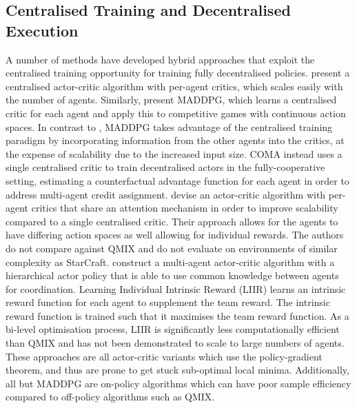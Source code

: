 \documentclass[twoside,11pt]{article}
\begin{document}
\subsection{Centralised Training and Decentralised Execution}
A number of methods have developed hybrid approaches that exploit the centralised training opportunity for training fully decentralised policies. 
\citet{gupta_cooperative_2017} present a centralised actor-critic algorithm with per-agent critics, which scales easily with the number of agents.
Similarly, \citet{lowe_multi-agent_2017} present MADDPG, which learns a 
centralised critic for each agent and apply this to competitive games with 
continuous action spaces.
In contrast to \citet{gupta_cooperative_2017}, MADDPG takes advantage of the centralised training paradigm by incorporating information from the other agents into the critics, at the expense of scalability due to the increased input size.
COMA \citep{foerster_counterfactual_2017} instead uses a single centralised critic to train 
decentralised actors in the fully-cooperative setting, estimating a counterfactual advantage function for each 
agent in order to address multi-agent credit assignment. 
\citet{iqbal_actor-attention-critic_2018} devise an actor-critic algorithm with per-agent critics that share an attention mechanism in order to improve scalability compared to a single centralised critic.
Their approach allows for the agents to have differing action spaces as well allowing for individual rewards. The authors do not compare against QMIX and do not evaluate on environments of similar complexity as StarCraft. 
\citet{de_witt_multi-agent_2018} construct a multi-agent actor-critic algorithm with a hierarchical actor policy that is able to use common knowledge between agents for coordination. 
Learning Individual Intrinsic Reward (LIIR) \citep{du_liir:_2019} learns an intrinsic reward function for each agent to supplement the team reward. The intrinsic reward function is trained such that it maximises the team reward function. As a bi-level optimisation process, LIIR is significantly less computationally efficient than QMIX and has not been demonstrated to scale to large numbers of agents.
These approaches are all actor-critic variants which use the policy-gradient theorem, and thus are prone to get stuck sub-optimal local minima. Additionally, all but MADDPG are on-policy algorithms which can have poor sample efficiency compared to off-policy algorithms such as QMIX.
\end{document}
